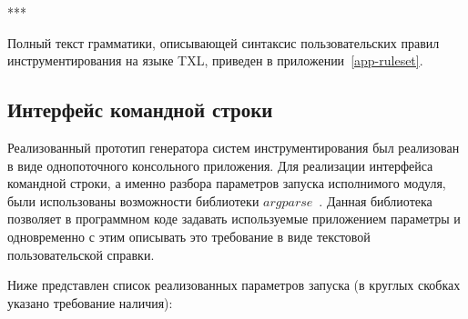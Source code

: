 ***

Полный текст грамматики, описывающей синтаксис пользовательских правил инструментирования на языке TXL, приведен в приложении~\ref{app-ruleset}.

\subsection{Интерфейс командной строки}

Реализованный прототип генератора систем инструментирования был реализован в виде однопоточного консольного приложения.
Для реализации интерфейса командной строки, а именно разбора параметров запуска исполнимого модуля, были использованы возможности библиотеки $argparse$~\cite{argparse}.
Данная библиотека позволяет в программном коде задавать используемые приложением параметры и одновременно с этим описывать это требование в виде текстовой пользовательской справки.

Ниже представлен список реализованных параметров запуска (в круглых скобках указано требование наличия):

